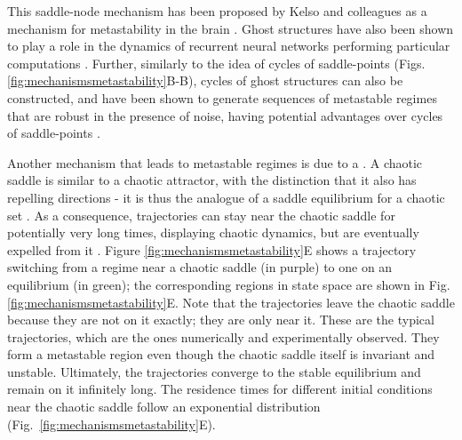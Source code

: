 This saddle-node mechanism has been proposed by Kelso and colleagues as a mechanism for metastability in the brain \cite{kelso1991an, tognoli2014metastable}. Ghost structures have also been shown to play a role in the dynamics of recurrent neural networks performing particular computations \cite{sussillo2013opening}. Further, similarly to the idea of cycles of saddle-points (Figs. \ref{fig:mechanismsmetastability}B-B\ssupprime), cycles of ghost structures can also be constructed, and have been shown to generate sequences of metastable regimes that are robust in the presence of noise, having potential advantages over cycles of saddle-points \cite{koch2023beyond}. 


Another mechanism that leads to metastable regimes is due to a . A chaotic saddle is similar to a chaotic attractor, with the distinction that it also has repelling directions - it is thus the analogue of a saddle equilibrium for a chaotic set \cite{lai2009transient}. As a consequence, trajectories can stay near the chaotic saddle for potentially very long times, displaying chaotic dynamics, but are eventually expelled from it \cite{yorke1979metastable}. Figure \ref{fig:mechanismsmetastability}E shows a trajectory switching from a regime near a chaotic saddle (in purple) to one on an equilibrium (in green); the corresponding regions in state space are shown in Fig. \ref{fig:mechanismsmetastability}E\supprime. Note that the trajectories leave the chaotic saddle because they are not on it exactly; they are only near it. These are the typical trajectories, which are the ones numerically and experimentally observed. They form a metastable region even though the chaotic saddle itself is invariant and unstable. Ultimately, the trajectories converge to the stable equilibrium and remain on it infinitely long.
The residence times for different initial conditions near the chaotic saddle follow an exponential distribution \cite{grebogi1983crises} (Fig.~\ref{fig:mechanismsmetastability}E\ssupprime).

